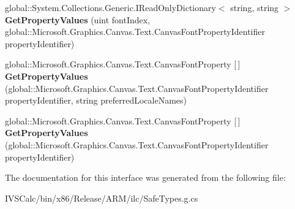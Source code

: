 \begin{DoxyCompactItemize}
\item 
\mbox{\label{interface_microsoft_1_1_graphics_1_1_canvas_1_1_text_1_1_i_canvas_font_set_a2a80bf73d063c25da9b75f227e594ff8}} 
global\+::\+System.\+Collections.\+Generic.\+I\+Read\+Only\+Dictionary$<$ string, string $>$ {\bfseries Get\+Property\+Values} (uint font\+Index, global\+::\+Microsoft.\+Graphics.\+Canvas.\+Text.\+Canvas\+Font\+Property\+Identifier property\+Identifier)
\item 
\mbox{\label{interface_microsoft_1_1_graphics_1_1_canvas_1_1_text_1_1_i_canvas_font_set_a8b18fb74693b3e6e70b6e7d5f9d95d79}} 
global\+::\+Microsoft.\+Graphics.\+Canvas.\+Text.\+Canvas\+Font\+Property \mbox{[}$\,$\mbox{]} {\bfseries Get\+Property\+Values} (global\+::\+Microsoft.\+Graphics.\+Canvas.\+Text.\+Canvas\+Font\+Property\+Identifier property\+Identifier, string preferred\+Locale\+Names)
\item 
\mbox{\label{interface_microsoft_1_1_graphics_1_1_canvas_1_1_text_1_1_i_canvas_font_set_a02fa760e9e493370176b87152cad6b1e}} 
global\+::\+Microsoft.\+Graphics.\+Canvas.\+Text.\+Canvas\+Font\+Property \mbox{[}$\,$\mbox{]} {\bfseries Get\+Property\+Values} (global\+::\+Microsoft.\+Graphics.\+Canvas.\+Text.\+Canvas\+Font\+Property\+Identifier property\+Identifier)
\end{DoxyCompactItemize}


The documentation for this interface was generated from the following file\+:\begin{DoxyCompactItemize}
\item 
I\+V\+S\+Calc/bin/x86/\+Release/\+A\+R\+M/ilc/Safe\+Types.\+g.\+cs\end{DoxyCompactItemize}
